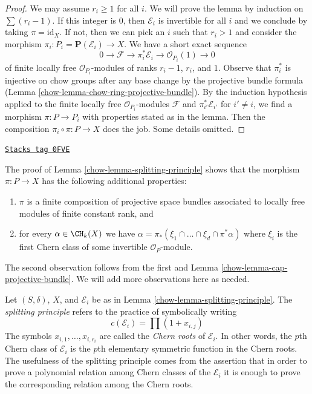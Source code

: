 \begin{proof}

We may assume $r_i \geq 1$ for all $i$. We will prove the lemma by induction
on $\sum (r_i - 1)$. If this integer is $0$, then $\mathcal{E}_i$
is invertible for all $i$ and we conclude by taking $\pi = \text{id}_X$.
If not, then we can pick an $i$ such that $r_i > 1$ and consider the
morphism $\pi_i : P_i = \mathbf{P}(\mathcal{E}_i) \to X$.
We have a short exact sequence
$$
0 \to \mathcal{F} \to \pi_i^*\mathcal{E}_i \to \mathcal{O}_{P_i}(1) \to 0
$$
of finite locally free $\mathcal{O}_{P_i}$-modules of ranks $r_i - 1$,
$r_i$, and $1$. Observe that $\pi_i^*$ is injective on chow groups
after any base change by the projective bundle formula
(Lemma \ref{chow-lemma-chow-ring-projective-bundle}).
By the induction hypothesis applied to the finite locally free
$\mathcal{O}_{P_i}$-modules $\mathcal{F}$ and $\pi_{i'}^*\mathcal{E}_{i'}$
for $i' \not = i$, we find a morphism $\pi : P \to P_i$ with
properties stated as in the lemma. Then the composition
$\pi_i \circ \pi : P \to X$ does the job. Some details omitted.
\end{proof}

\begin{remark}
\label{chow-remark-the-proof-shows-more}
\href{https://stacks.math.columbia.edu/tag/0FVE}{\texttt{Stacks tag 0FVE}}

The proof of Lemma \ref{chow-lemma-splitting-principle}
shows that the morphism $\pi : P \to X$ has the following additional
properties:
\begin{enumerate}
\item $\pi$ is a finite composition of projective space bundles
associated to locally free modules of finite constant rank, and
\item for every $\alpha \in \CH_k(X)$ we have
$\alpha = \pi_*(\xi_1 \cap \ldots \cap \xi_d \cap \pi^*\alpha)$
where $\xi_i$ is the first Chern class of some invertible
$\mathcal{O}_P$-module.
\end{enumerate}
The second observation follows from the first and
Lemma \ref{chow-lemma-cap-projective-bundle}.
We will add more observations here as needed.
\end{remark}

Let $(S, \delta)$, $X$, and $\mathcal{E}_i$ be as in
Lemma \ref{chow-lemma-splitting-principle}.
The {\it splitting principle} refers to the practice of symbolically writing
$$
c(\mathcal{E}_i) = \prod (1 + x_{i, j})
$$
The symbols $x_{i, 1}, \ldots, x_{i, r_i}$ are called the {\it Chern roots}
of $\mathcal{E}_i$. In other words, the $p$th Chern class of $\mathcal{E}_i$
is the $p$th elementary symmetric function in the Chern roots.
The usefulness of the splitting principle comes from the assertion that
in order to prove a polynomial relation among Chern classes of the
$\mathcal{E}_i$ it is enough to prove the corresponding relation among the
Chern roots.


